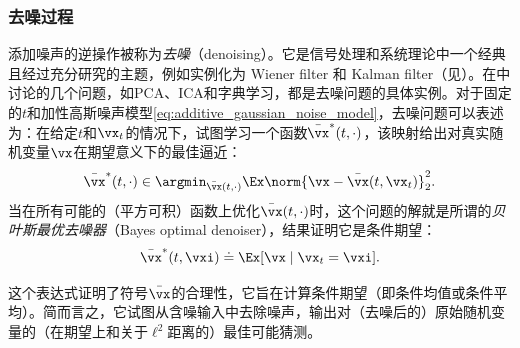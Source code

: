 \documentclass[../../book-main_zh.tex]{subfiles}
\begin{document}
\subsubsection{去噪过程}
添加噪声的逆操作被称为\textit{去噪}（denoising）。它是信号处理和系统理论中一个经典且经过充分研究的主题，例如实例化为 Wiener filter 和 Kalman filter（见）。在中讨论的几个问题，如PCA、ICA和字典学习，都是去噪问题的具体实例。对于固定的\(t\)和加性高斯噪声模型\eqref{eq:additive_gaussian_noise_model}，去噪问题可以表述为：在给定\(t\)和\(\vx_{t}\)的情况下，试图学习一个函数\(\bar{\vx}^{\ast}(t, \cdot)\)，该映射给出对真实随机变量\(\vx\)在期望意义下的最佳逼近：
\begin{equation}\label{eq:denoising_loss}
    \bar{\vx}^{\ast}(t, \cdot) \in \argmin_{\bar{\vx}(t,
    \cdot)}\Ex\norm{\vx - \bar{\vx}(t, \vx_{t})}_{2}^{2}.
\end{equation}
当在所有可能的（平方可积）函数上优化\(\bar{\vx}(t, \cdot)\)时，这个问题的解就是所谓的\textit{贝叶斯最优去噪器}（Bayes optimal denoiser），结果证明它是条件期望：
\begin{equation}\label{eq:optimal_denoiser}
    \bar{\vx}^{\ast}(t, \vxi) \doteq \Ex[\vx \mid \vx_{t} = \vxi].
\end{equation}

这个表达式证明了符号\(\bar{\vx}\)的合理性，它旨在计算条件期望（即条件均值或条件平均）。简而言之，它试图从含噪输入中去除噪声，输出对（去噪后的）原始随机变量的（在期望上和关于\(\ell^{2}\)距离的）最佳可能猜测。
\end{document}
